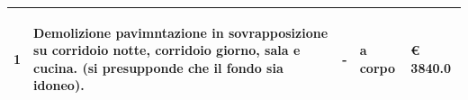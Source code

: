 \documentclass[a4paper]{article}
\begin{document}
\begin{tabular}{ | L{10mm} |  L{86mm} | L{12mm} | L{12mm} | L{16mm} | }
                                   \vspace{2.5mm}
                                   \begin{spacing}{0}
                                1
                                   \end{spacing} &
                                   \vspace{2.5mm}
                                   \begin{spacing}{0}
                                Demolizione pavimntazione in sovrapposizione su corridoio notte, corridoio giorno, sala e cucina. (si presupponde che il fondo sia idoneo).
                                   \end{spacing} &
                                   \vspace{2.5mm}
                                   \begin{spacing}{0}
                                -
                                   \end{spacing} &
                                   \vspace{2.5mm}
                                   \begin{spacing}{0}
                                a corpo
                                   \end{spacing} &
                                   \vspace{2.5mm}
                                   \begin{spacing}{0}
                                     \euro\hfill 
                                 3840.0
                                   \end{spacing} \\
                                   \hline


\end{tabular}
\end{document}
